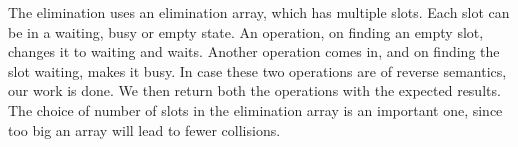 The elimination uses an elimination array, which has multiple slots. Each slot can be in a waiting, busy or empty state. An operation, on finding an empty slot, changes it to waiting and waits. Another operation comes in, and on finding the slot waiting, makes it busy. In case these two operations are of reverse semantics, our work is done. We then return both the operations with the expected results. The choice of number of slots in the elimination array is an important one, since too big an array will lead to fewer collisions.


